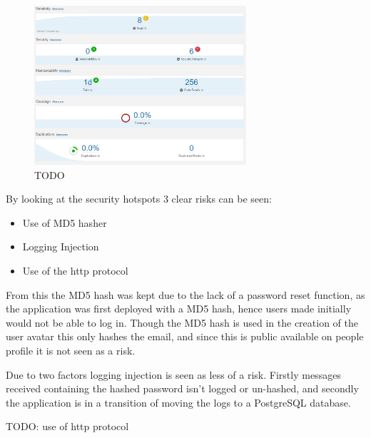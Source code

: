 \documentclass[report/main.tex]{subfiles}
\begin{document}
        \begin{figure}[H]
            \centering
            \includegraphics[width=0.7\textwidth]{report/images/SonarCloud Report.png}
            \caption{TODO}
            \label{fig:sonarcloud}
        \end{figure}
        
        By looking at the security hotspots 3 clear risks can be seen:
        
        \begin{itemize}
            \item Use of MD5 hasher
            \item Logging Injection
            \item Use of the http protocol
        \end{itemize}
        
        From this the MD5 hash was kept due to the lack of a password reset function, as the application was first deployed with a MD5 hash, hence users made initially would not be able to log in. Though the MD5 hash is used in the creation of the user avatar this only hashes the email, and since this is public available on people profile it is not seen as a risk.
        
        Due to two factors logging injection is seen as less of a risk. Firstly messages received containing the hashed password isn't logged or un-hashed, and secondly the application is in a transition of moving the logs to a PostgreSQL database.
        
        TODO: use of http protocol
\end{document}
